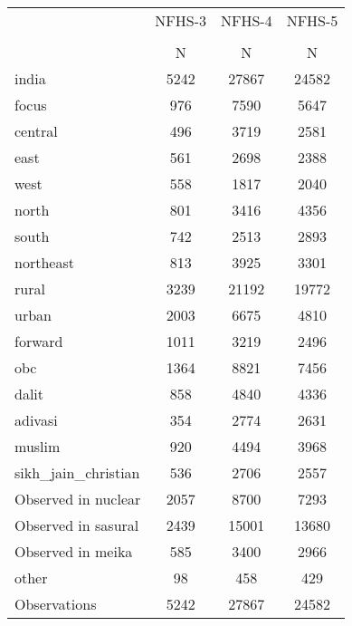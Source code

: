 {
\def\sym#1{\ifmmode^{#1}\else\(^{#1}\)\fi}
\begin{tabular}{l*{3}{c}}
\toprule
                    &      NFHS-3&      NFHS-4&      NFHS-5\\
                    &\multicolumn{1}{c}{}&\multicolumn{1}{c}{}&\multicolumn{1}{c}{}\\
                    &           N&           N&           N\\
\midrule
india               &        5242&       27867&       24582\\
focus               &         976&        7590&        5647\\
central             &         496&        3719&        2581\\
east                &         561&        2698&        2388\\
west                &         558&        1817&        2040\\
north               &         801&        3416&        4356\\
south               &         742&        2513&        2893\\
northeast           &         813&        3925&        3301\\
rural               &        3239&       21192&       19772\\
urban               &        2003&        6675&        4810\\
forward             &        1011&        3219&        2496\\
obc                 &        1364&        8821&        7456\\
dalit               &         858&        4840&        4336\\
adivasi             &         354&        2774&        2631\\
muslim              &         920&        4494&        3968\\
sikh\_jain\_christian &         536&        2706&        2557\\
Observed in nuclear &        2057&        8700&        7293\\
Observed in sasural &        2439&       15001&       13680\\
Observed in meika   &         585&        3400&        2966\\
other               &          98&         458&         429\\
\midrule
Observations        &        5242&       27867&       24582\\
\bottomrule
\end{tabular}
}
